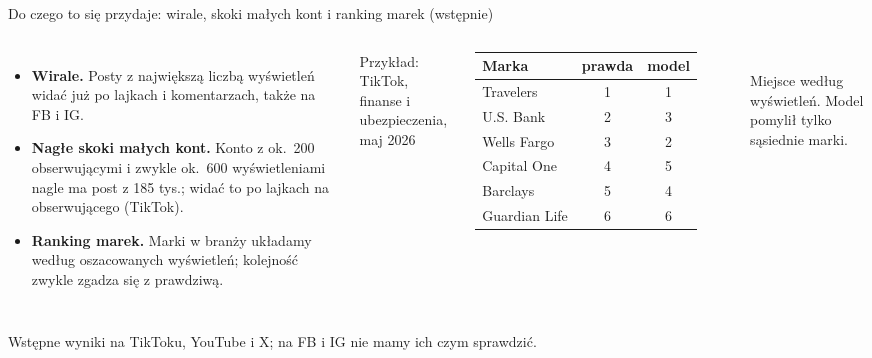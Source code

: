 \documentclass[aspectratio=169,10pt]{beamer}
\begin{document}
\begin{frame}{Do czego to się przydaje: wirale, skoki małych kont i ranking marek (wstępnie)}
\begin{columns}[T]
\normalsize
\begin{itemize}\setlength\itemsep{5pt}
\item \textbf{Wirale.} Posty z największą liczbą wyświetleń widać już po lajkach i komentarzach, także na FB i IG.
\item \textbf{Nagłe skoki małych kont.} Konto z ok.\ 200 obserwującymi i zwykle ok.\ 600 wyświetleniami nagle ma post z \alert{185 tys.}; widać to po lajkach na obserwującego (TikTok).
\item \textbf{Ranking marek.} Marki w branży układamy według oszacowanych wyświetleń; kolejność zwykle zgadza się z prawdziwą.
\end{itemize}
\centering\scriptsize\setlength{\tabcolsep}{3pt}\renewcommand{\arraystretch}{1.05}
{\footnotesize Przykład: TikTok, finanse i ubezpieczenia, maj 2026}\\[3pt]
\begin{tabular}{lcc}
\toprule
Marka & prawda & model \\
\midrule
Travelers & 1 & 1 \\
U.S. Bank & 2 & \alert{3} \\
Wells Fargo & 3 & \alert{2} \\
Capital One & 4 & \alert{5} \\
Barclays & 5 & \alert{4} \\
Guardian Life & 6 & 6 \\
\bottomrule
\end{tabular}\\[3pt]
{\scriptsize\color{mut} Miejsce według wyświetleń. Model pomylił tylko sąsiednie marki.}
\end{columns}
\vfill
{\scriptsize\color{mut} Wstępne wyniki na TikToku, YouTube i X; na FB i IG nie mamy ich czym sprawdzić.}
\end{frame}
\end{document}
